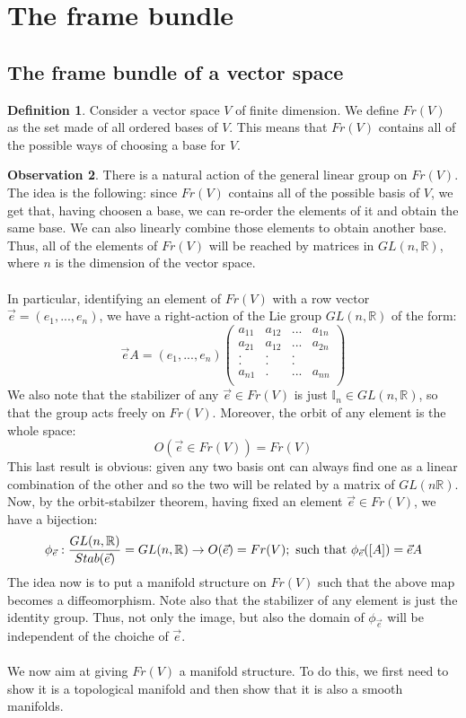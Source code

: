 \documentclass[12pt,a4paper]{report}
\theoremstyle{definition}
\newtheorem{Def}{Definition}[chapter]
\theoremstyle{Theorem}
\theoremstyle{definition}
\theoremstyle{definition}
\newtheorem{Obs}[Def]{Observation}
\begin{document}
		\section{The frame bundle}
		\subsection{The frame bundle of a vector space}
		\begin{Def}\label{Def_6.5}
			Consider a vector space $V$ of finite dimension. We define $Fr(V)$ as the set made of all ordered bases of $V$. This means that $Fr(V)$ contains all of the possible ways of choosing a base for $V$.
		\end{Def}
		\begin{Obs}
			There is a natural action of the general linear group on $Fr(V)$. The idea is the following: since $Fr(V)$ contains all of the possible basis of $V$, we get that, having choosen a base, we can re-order the elements of it and obtain the same base. We can also linearly combine those elements to obtain another base. Thus, all of the elements of $Fr(V)$ will be reached by matrices in $GL(n,\mathbb{R})$, where $n$ is the dimension of the vector space.\\
			\\
			In particular, identifying an element of $Fr(V)$ with a row vector $\vec{e}=(e_1,...,e_n)$, we have a right-action of the Lie group $GL(n,\mathbb{R})$ of the form:
			$$\vec{e}A=(e_1,...,e_n)\begin{pmatrix}
				a_{11}&a_{12}&...&a_{1n}\\
				a_{21}&a_{12}&...&a_{2n}\\
				.     &.     &.   &     \\
				.     &.     &.   &     \\
				a_{n1}&.     &...&a_{nn}\\
			\end{pmatrix}$$
			We also note that the stabilizer of any $\vec{e}\in Fr(V)$ is just $\mathbb{I}_n\in GL(n,\mathbb{R})$, so that the group acts freely on $Fr(V)$. Moreover, the orbit of any element is the whole space: 
			$$O(\vec{e}\in Fr(V))=Fr(V)$$
			This last result is obvious: given any two basis ont can always find one as a linear combination of the other and so the two will be related by a matrix of $GL(n\mathbb{R})$.
			Now, by the orbit-stabilzer theorem, having fixed an element $\vec{e}\in Fr(V)$, we have a bijection:
			$$\phi_{\vec{e}}:{GL(n,\mathbb{R})\over Stab(\vec{e})}=GL(n,\mathbb{R})\rightarrow O(\vec{e})=Fr(V);\hbox{ such that } \phi_{\vec{e}}([A])=\vec{e}A$$
			The idea now is to put a manifold structure on $Fr(V)$ such that the above map becomes a diffeomorphism. Note also that the stabilizer of any element is just the identity group. Thus, not only the image, but also the domain of $\phi_{\vec{e}}$ will be independent of the choiche of $\vec{e}$. \\
			\\
			We now aim at giving $Fr(V)$ a manifold structure. To do this, we first need to show it is a topological manifold and then show that it is also a smooth manifolds.
		\end{Obs}
\end{document}
